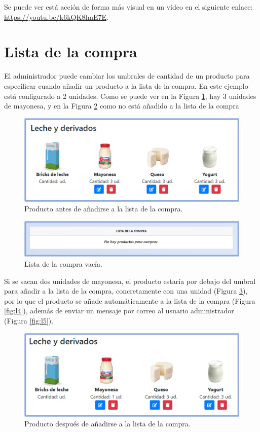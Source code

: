 \newpage
Se puede ver está acción de forma más visual en un vídeo en el siguiente enlace: \url{https://youtu.be/k6kQK8lmE7E}.

\section{Lista de la compra}
El administrador puede cambiar los umbrales de cantidad de un producto para especificar cuando añadir un producto a la lista de la compra. En este ejemplo está configurado a 2 unidades. Como se puede ver en la Figura \ref{fig:l1}, hay 3 unidades de mayonesa, y en la Figura \ref{fig:l2} como no está añadido a la lista de la compra

\begin{figure}[h] 
    \centering
    \includegraphics[width=.80\textwidth]{capitulos/capitulo10/listacompra/1.png}
    \caption{Producto antes de añadirse a la lista de la compra.}
    \label{fig:l1}
\end{figure}

\begin{figure}[h] 
    \centering
    \includegraphics[width=.80\textwidth]{capitulos/capitulo10/listacompra/2.png}
    \caption{Lista de la compra vacía.}
    \label{fig:l2}
\end{figure}

\newpage
Si se sacan dos unidades de mayonesa, el producto estaría por debajo del umbral para añadir a la lista de la compra, concretamente con una unidad (Figura \ref{fig:l3}), por lo que el producto se añade automáticamente a la lista de la compra (Figura \ref{fig:l4}), además de enviar un mensaje por correo al usuario administrador (Figura \ref{fig:l5}). 

\begin{figure}[h] 
    \centering
    \includegraphics[width=.80\textwidth]{capitulos/capitulo10/listacompra/3.png}
    \caption{Producto después de añadirse a la lista de la compra.}
    \label{fig:l3}
\end{figure}

